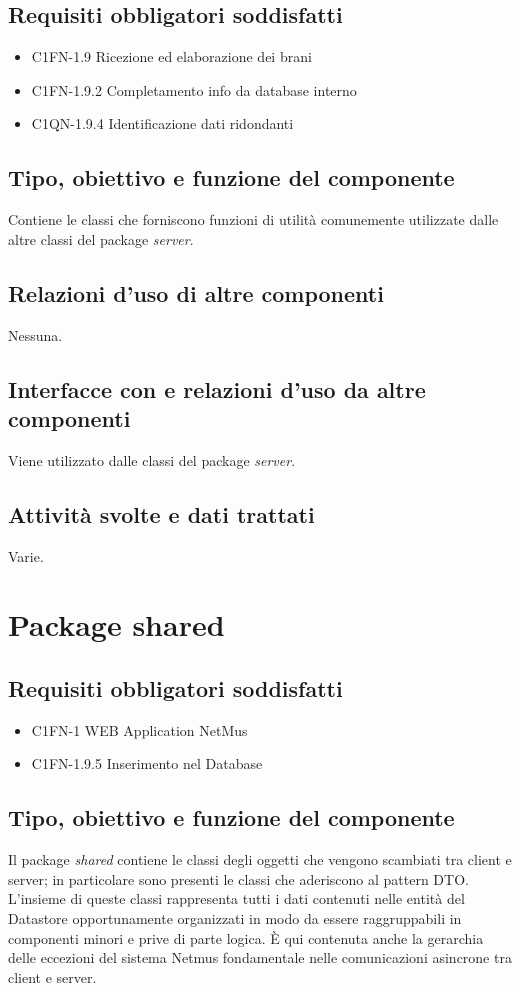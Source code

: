 \subsection*{Requisiti obbligatori soddisfatti}
\begin{itemize}
	\item C1FN-1.9 Ricezione ed elaborazione dei brani
	\item C1FN-1.9.2 Completamento info da database interno
	\item C1QN-1.9.4 Identificazione dati ridondanti
\end{itemize}
\subsection*{Tipo, obiettivo e funzione del componente}
Contiene le classi che forniscono funzioni di utilit\`a comunemente utilizzate
dalle altre classi del package \emph{server}.
\subsection*{Relazioni d'uso di altre componenti}
Nessuna.
\subsection*{Interfacce con e relazioni d'uso da altre componenti}
Viene utilizzato dalle classi del package \emph{server}.
\subsection*{Attivit\`a svolte e dati trattati}
Varie.

\newpage
\section{Package shared}
\subsection*{Requisiti obbligatori soddisfatti}
\begin{itemize}
  	\item C1FN-1 WEB Application NetMus
	\item C1FN-1.9.5 Inserimento nel Database
\end{itemize}
\subsection*{Tipo, obiettivo e funzione del componente}
Il package \emph{shared} contiene le classi degli oggetti che vengono
scambiati tra client e server; in particolare sono presenti le classi che
aderiscono al pattern DTO. L'insieme di queste classi rappresenta tutti i
dati contenuti nelle entit\`a del Datastore opportunamente organizzati in modo
da essere raggruppabili in componenti minori e prive di parte logica.
\`E qui contenuta anche la gerarchia delle eccezioni del sistema Netmus
fondamentale nelle comunicazioni asincrone tra client e server.
